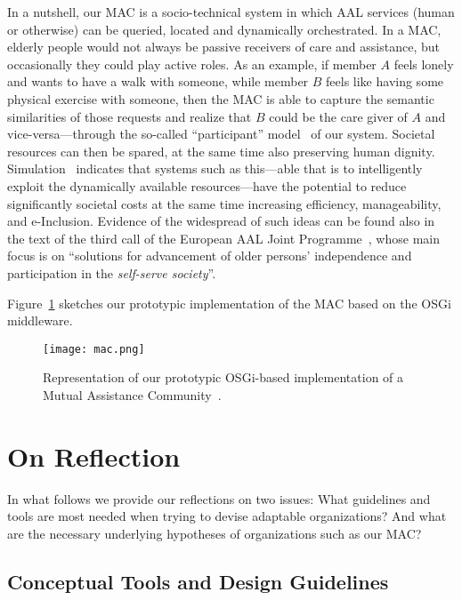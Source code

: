 \documentclass{llncs}
\begin{document}
In a nutshell, our MAC is a socio-technical system in which AAL services (human or otherwise) can be
queried, located and dynamically orchestrated. In a MAC, elderly people would not
always be passive receivers of care and assistance, but occasionally they could play active roles. As an
example, if member $A$ feels lonely and wants to have a walk with someone, while member $B$ feels like
having some physical exercise with someone, then the MAC is able to capture the semantic similarities of
those requests and realize that $B$ could be the care giver of $A$ and vice-versa---through the
so-called ``participant'' model~\cite{SDGB07a} of our system.
Societal resources can then be spared, at the same time also preserving human dignity.
Simulation~\cite{SDFB06a} indicates
that systems such as this---able that is
to intelligently exploit the dynamically available resources---have the
potential to reduce significantly societal costs at the same time increasing efficiency,
manageability, and e-Inclusion.
Evidence of the widespread of such ideas can
be found also in the text of the third call of the European AAL Joint Programme~\cite{AAL-3}, whose main
focus is on ``solutions for advancement of older persons' independence and participation in the
\emph{self-serve society}''.

Figure~\ref{f:mac} sketches our prototypic implementation of the MAC based on the OSGi middleware.
\begin{figure}[t]
\centerline{\texttt{[image: mac.png]}}
\caption{Representation of our prototypic OSGi-based implementation of a Mutual Assistance Community~\cite{SDGB10b}.}
	\label{f:mac}
\end{figure}





\section{On Reflection}\label{s:onrefl}


In what follows we provide our reflections on two issues:  What guidelines and tools are
most needed when trying to devise adaptable organizations? And what are the necessary underlying
hypotheses of organizations such as our MAC?


\subsection{Conceptual Tools and Design Guidelines}
\end{document}
